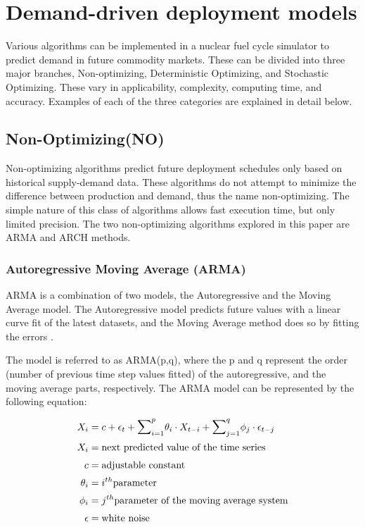 \section{ Demand-driven deployment models}
Various algorithms can be implemented in a nuclear fuel cycle simulator to 
predict demand in future commodity markets. These can be divided into three 
major branches, Non-optimizing, Deterministic Optimizing, and Stochastic 
Optimizing. These vary in applicability, complexity, computing time, and 
accuracy. Examples of each of the three categories are explained in detail below. 

\subsection{Non-Optimizing(NO)}

Non-optimizing algorithms predict future deployment schedules
only based on historical supply-demand data. These algorithms do not attempt
to minimize the difference between production and demand,
thus the name non-optimizing. The simple nature of this class of algorithms
allows fast execution time, but only limited precision. The
two non-optimizing algorithms explored in this paper are \gls{ARMA}
and \gls{ARCH} methods. 

\subsubsection{Autoregressive Moving Average (ARMA)}

\gls{ARMA} is a combination of two models, the Autoregressive
and the Moving Average model. The Autoregressive model 
predicts future values with a linear curve fit of the latest
datasets, and the Moving Average method does so by fitting the 
errors \cite{stine_introduction_2011}.

The model is referred to as ARMA(p,q), where the p and q represent 
the order (number of previous time step values fitted) of the autoregressive,
and the moving average parts,
respectively. 
The \gls{ARMA} model can be represented by the following equation:

\begin{align} 
	X_i&=c + \epsilon_t + {\mathlarger{\sum}}_{i=1}^{p}\theta_i \cdot X_{t-i}+
	 {\mathlarger{\sum}}_{j=1}^{q}\phi_j\cdot\epsilon_{t-j}\\
	X_i&= \mbox{next predicted value of the time series}\\
	c&= \mbox{adjustable constant}\\
	\theta_i&=i^{th} \mbox{parameter}\\
	\phi_i&=j^{th} \mbox{parameter of the moving average system}\\
	\epsilon &= \mbox{white noise}
\end{align}


